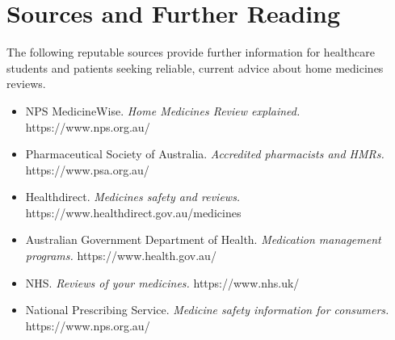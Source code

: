 \section*{Sources and Further Reading}
The following reputable sources provide further information for healthcare students and patients seeking reliable, current advice about home medicines reviews.

\begin{itemize}
    \item NPS MedicineWise. \textit{Home Medicines Review explained.} https://www.nps.org.au/
    \item Pharmaceutical Society of Australia. \textit{Accredited pharmacists and HMRs.} https://www.psa.org.au/
    \item Healthdirect. \textit{Medicines safety and reviews.} https://www.healthdirect.gov.au/medicines
    \item Australian Government Department of Health. \textit{Medication management programs.} https://www.health.gov.au/
    \item NHS. \textit{Reviews of your medicines.} https://www.nhs.uk/
    \item National Prescribing Service. \textit{Medicine safety information for consumers.} https://www.nps.org.au/
\end{itemize}
